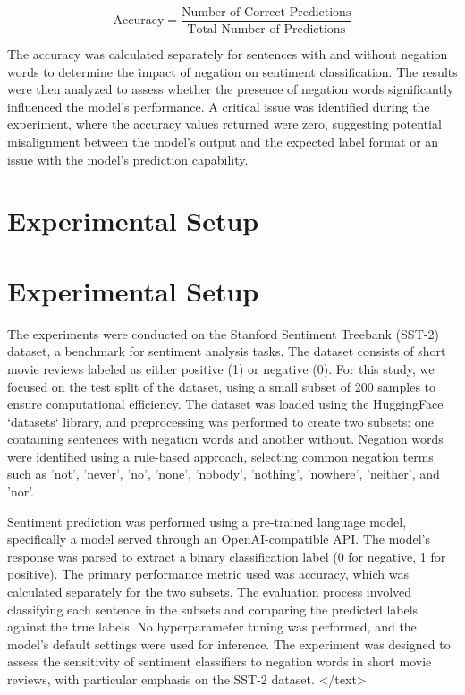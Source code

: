 \documentclass{article}
\begin{document}
$$
\text{Accuracy} = \frac{\text{Number of Correct Predictions}}{\text{Total Number of Predictions}}
$$

The accuracy was calculated separately for sentences with and without negation words to determine the impact of negation on sentiment classification. The results were then analyzed to assess whether the presence of negation words significantly influenced the model's performance. A critical issue was identified during the experiment, where the accuracy values returned were zero, suggesting potential misalignment between the model's output and the expected label format or an issue with the model's prediction capability.
\section{Experimental Setup}
\section{Experimental Setup}

The experiments were conducted on the Stanford Sentiment Treebank (SST-2) dataset, a benchmark for sentiment analysis tasks. The dataset consists of short movie reviews labeled as either positive (1) or negative (0). For this study, we focused on the test split of the dataset, using a small subset of 200 samples to ensure computational efficiency. The dataset was loaded using the HuggingFace `datasets` library, and preprocessing was performed to create two subsets: one containing sentences with negation words and another without. Negation words were identified using a rule-based approach, selecting common negation terms such as 'not', 'never', 'no', 'none', 'nobody', 'nothing', 'nowhere', 'neither', and 'nor'.

Sentiment prediction was performed using a pre-trained language model, specifically a model served through an OpenAI-compatible API. The model's response was parsed to extract a binary classification label (0 for negative, 1 for positive). The primary performance metric used was accuracy, which was calculated separately for the two subsets. The evaluation process involved classifying each sentence in the subsets and comparing the predicted labels against the true labels. No hyperparameter tuning was performed, and the model's default settings were used for inference. The experiment was designed to assess the sensitivity of sentiment classifiers to negation words in short movie reviews, with particular emphasis on the SST-2 dataset.
</text>
\end{document}
